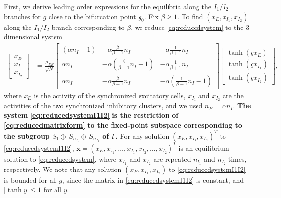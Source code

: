\documentclass[reqno]{siamonline190516}
\newcommand{\xvec}{\mathbf{x}}
\newcommand{\revised}[1]{ \textbf{#1} }
\begin{document}
First, we derive leading order expressions for the equilibria along the $I_1/I_2$ branches for $g$ close to the bifurcation point $g_0$. Fix $\beta \geq 1$. To find $(x_E, x_{I_1}, x_{I_2})$ along the $I_1/I_2$ branch corresponding to $\beta$, we reduce \cref{eq:reducedsystem} to the 3-dimensional system
\begin{equation}\label{eq:reducedsystemI1I2}
 \begin{aligned}
 \begin{bmatrix} x_E\\x_{I_1}\\x_{I_2}\end{bmatrix} 
 &= \frac{\mu_{EE}}{\sqrt{N}} 
 \begin{bmatrix} (\alpha n_I - 1) & -\alpha \frac{\beta}{\beta+1} n_I & - \alpha \frac{1}{\beta+1} n_I  \\
    \alpha n_I  & -\alpha \left(\frac{\beta}{\beta+1} n_I-1\right) & - \alpha \frac{1}{\beta+1} n_I  \\
    \alpha n_I & -\alpha \frac{\beta}{\beta+1} n_I & -\alpha \left(\frac{1}{\beta+1} n_I-1\right)
 \end{bmatrix}
 \begin{bmatrix} \tanh(g x_E) \\\tanh ( g x_{I_1} ) \\\tanh(g x_{I_2})\end{bmatrix},
 \end{aligned}
\end{equation}
where $x_E$ is the activity of the synchronized excitatory cells, $x_{I_1}$ and $x_{I_2}$ are the activities of the two synchronized inhibitory clusters, and we used $n_E = \alpha n_I$. 
\revised{
The system \cref{eq:reducedsystemI1I2} is the restriction of \cref{eq:reducedmatrixform} to the fixed-point subspace corresponding to the subgroup $S_1 \oplus \, S_{n_{I_1}} \oplus \, S_{n_{I_2}}$ of $\Gamma$.
}
For any solution $(x_E, x_{I_1}, x_{I_2})^T$ to \cref{eq:reducedsystemI1I2}, $\xvec = (x_E, x_{I_1}, \dots, x_{I_1}, x_{I_2}, \dots, x_{I_2})^T$ is an equilibrium solution to \cref{eq:reducedsystem}, where $x_{I_1}$ and $x_{I_2}$ are repeated $n_{I_1}$ and $n_{I_2}$ times, respectively. We note that any solution $(x_E, x_{I_1}, x_{I_2})$ to \cref{eq:reducedsystemI1I2} is bounded for all $g$, since the matrix in \cref{eq:reducedsystemI1I2} is constant, and $|\tanh y| \leq 1$ for all $y$. 
\end{document}
